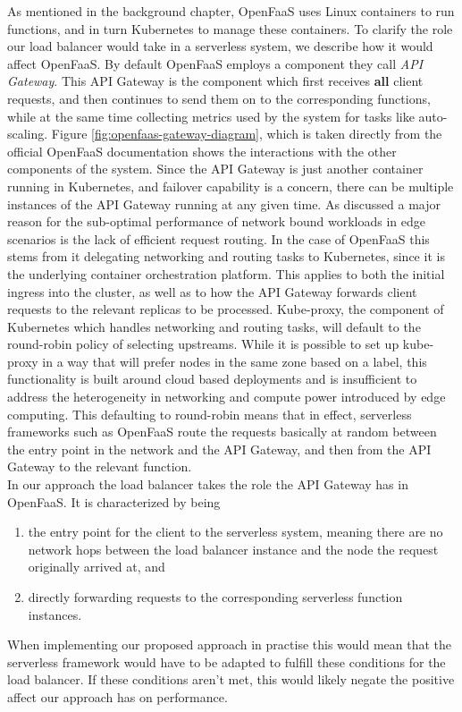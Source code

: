 As mentioned in the background chapter, OpenFaaS uses Linux containers to run functions, and in turn Kubernetes to manage these containers. To clarify the role our load balancer would take in a serverless system, we describe how it would affect OpenFaaS. By default OpenFaaS employs a component they call \textit{API Gateway}. This API Gateway is the component which first receives \textbf{all} client requests, and then continues to send them on to the corresponding functions, while at the same time collecting metrics used by the system for tasks like auto-scaling. Figure \ref{fig:openfaas-gateway-diagram}, which is taken directly from the official OpenFaaS documentation shows the interactions with the other components of the system. Since the API Gateway is just another container running in Kubernetes\cite{kubernetes}, and failover capability is a concern, there can be multiple instances of the API Gateway running at any given time.
As discussed a major reason for the sub-optimal performance of network bound workloads in edge scenarios is the lack of efficient request routing.
In the case of OpenFaaS this stems from it delegating networking and routing tasks to Kubernetes, since it is the underlying container orchestration platform. This applies to both the initial ingress into the cluster, as well as to how the API Gateway forwards client requests to the relevant replicas to be processed. Kube-proxy, the component of Kubernetes which handles networking and routing tasks, will default to the round-robin policy of selecting upstreams. While it is possible to set up kube-proxy in a way that will prefer nodes in the same zone based on a label, this functionality is built around cloud based deployments and is insufficient to address the heterogeneity in networking and compute power introduced by edge computing. This defaulting to round-robin means that in effect, serverless frameworks such as OpenFaaS route the requests basically at random between the entry point in the network and the API Gateway, and then from the API Gateway to the relevant function.\\
In our approach the load balancer takes the role the API Gateway has in OpenFaaS. It is characterized by being
\begin{enumerate}
    \item the entry point for the client to the serverless system, meaning there are no network hops between the load balancer instance and the node the request originally arrived at, and
    \item directly forwarding requests to the corresponding serverless function instances.
\end{enumerate}
When implementing our proposed approach in practise this would mean that the serverless framework would have to be adapted to fulfill these conditions for the load balancer. If these conditions aren't met, this would likely negate the positive affect our approach has on performance.

